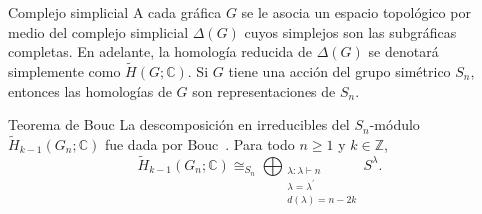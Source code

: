 \documentclass[final,xcolor=svgnames]{beamer}
\begin{document}
\begin{frame}{}
\begin{columns}
\begin{column}{0.5\textwidth}

      \begin{block}{Complejo simplicial}
        A cada gráfica $G$ se le asocia un espacio topológico por
        medio del complejo simplicial $\Delta(G)$ cuyos simplejos son
        las subgráficas completas. En adelante, la homología reducida
        de $\Delta(G)$ se denotará simplemente como $\widetilde
        H(G;\mathbb{C})$. Si $G$ tiene una acción del grupo simétrico
        $S_{n}$, entonces las homologías de $G$ son representaciones
        de $S_{n}$.
      \end{block}

      \begin{block}{Teorema de Bouc}
        La descomposición en irreducibles del $S_{n}$-módulo
        $\widetilde H_{k-1}(G_{n};\mathbb{C})$ fue dada por Bouc~\cite{MR756517}. Para
        todo $n\geq1$ y $k\in \mathbb{Z}$,
          \begin{equation*}
            \widetilde H_{k-1}(G_{n};\mathbb{C})\cong_{S_{n}}\bigoplus_{\substack{\lambda:\lambda\vdash n\\
              \lambda=\lambda^{'}\\d(\lambda)=n-2k}} S^{\lambda}.
          \end{equation*}
       \end{block}
       

\end{column}
\end{columns}
\end{frame}
\end{document}
